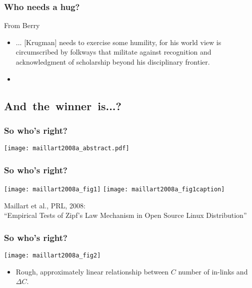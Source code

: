 \begin{frame}
  \frametitle{Who needs a hug?}

  \begin{block}{From Berry\cite{berry1999a}}
    \begin{itemize}
    \item<1-> ... [Krugman] needs to exercise some humility, for his 
    world view is circumscribed by folkways that militate against recognition and 
    acknowledgment of scholarship beyond his disciplinary frontier. 
    \item<2-> 
    \end{itemize}

  \end{block}
  
\end{frame}

\subsection{And\ the\ winner\ is...?}

\begin{frame}
  \frametitle{So who's right?}

  \begin{block}{}
    \texttt{[image: maillart2008a\_abstract.pdf]}
  \end{block}

\end{frame}

\begin{frame}
  \frametitle{So who's right?}

  \begin{block}{}
  \texttt{[image: maillart2008a\_fig1]}
  \texttt{[image: maillart2008a\_fig1caption]}
  
  \bigskip

  Maillart et al., PRL, 2008:\\
  ``Empirical Tests of {Z}ipf's Law Mechanism in 
  Open Source {L}inux Distribution''\cite{maillart2008a}
  \end{block}
  
\end{frame}

\begin{frame}
  \frametitle{So who's right?}

  \begin{block}{}
    \texttt{[image: maillart2008a\_fig2]}
    
    \begin{itemize}
    \item<1-> 
      Rough, approximately linear relationship
      between $C$ number of in-links and $\Delta C$.
    \end{itemize}
  \end{block}

\end{frame}

